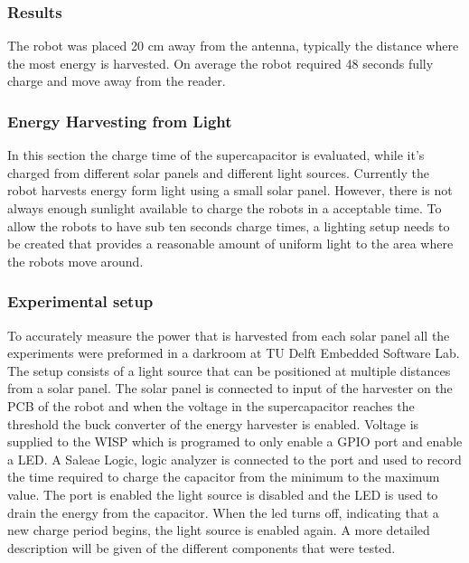 \subsubsection{Results}
The robot was placed 20 cm away from the antenna, typically the distance where the most energy is harvested.
On average the robot required 48 seconds fully charge and move away from the reader.

\subsubsection{Energy Harvesting from Light}

In this section the charge time of the supercapacitor is evaluated, while it's charged from different solar panels and different light sources.
Currently the robot harvests energy form light using a small solar panel.
However, there is not always enough sunlight available to charge the robots in a acceptable time.
To allow the robots to have sub ten seconds charge times, a lighting setup needs to be created that provides a reasonable amount of uniform light to the area where the robots move around.


\subsubsection{Experimental setup}
To accurately measure the power that is harvested from each solar panel all the experiments were preformed in a darkroom at TU Delft Embedded Software Lab.
The setup consists of a light source that can be positioned at multiple distances from a solar panel.
The solar panel is connected to input of the harvester on the PCB of the robot and when the voltage in the supercapacitor reaches the threshold the buck converter of the energy harvester is enabled.
Voltage is supplied to the WISP which is programed to only enable a GPIO port and enable a LED.
A Saleae Logic, logic analyzer is connected to the port and used to record the time required to charge the capacitor from the minimum to the maximum value.
The port is enabled the light source is disabled and the LED is used to drain the energy from the capacitor.
When the led turns off, indicating that a new charge period begins, the light source is enabled again.
A more detailed description will be given of the different components that were tested.


